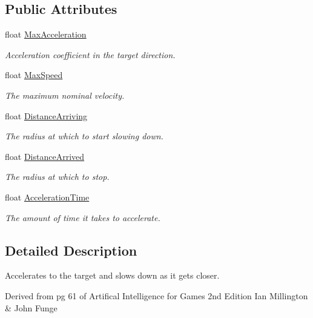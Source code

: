 \subsection*{Public Attributes}
\begin{DoxyCompactItemize}
\item 
float \hyperlink{class_skyrates_1_1_common_1_1_a_i_1_1_arrive_a97aaffa0306389d11c5d75faf0d3f7c9}{Max\-Acceleration}
\begin{DoxyCompactList}\small\item\em Acceleration coefficient in the target direction. \end{DoxyCompactList}\item 
float \hyperlink{class_skyrates_1_1_common_1_1_a_i_1_1_arrive_a85ab230f89389f96567f11f0fc70d666}{Max\-Speed}
\begin{DoxyCompactList}\small\item\em The maximum nominal velocity. \end{DoxyCompactList}\item 
float \hyperlink{class_skyrates_1_1_common_1_1_a_i_1_1_arrive_a5e20a0f88fbed311dfa8df2f469f6c3f}{Distance\-Arriving}
\begin{DoxyCompactList}\small\item\em The radius at which to start slowing down. \end{DoxyCompactList}\item 
float \hyperlink{class_skyrates_1_1_common_1_1_a_i_1_1_arrive_aed0ecb85d42852c1c08903a897241773}{Distance\-Arrived}
\begin{DoxyCompactList}\small\item\em The radius at which to stop. \end{DoxyCompactList}\item 
float \hyperlink{class_skyrates_1_1_common_1_1_a_i_1_1_arrive_a7af8e494ae9c995e173e25e4af34f442}{Acceleration\-Time}
\begin{DoxyCompactList}\small\item\em The amount of time it takes to accelerate. \end{DoxyCompactList}\end{DoxyCompactItemize}


\subsection{Detailed Description}
Accelerates to the target and slows down as it gets closer. 

Derived from pg 61 of Artifical Intelligence for Games 2nd Edition Ian Millington \& John Funge 

